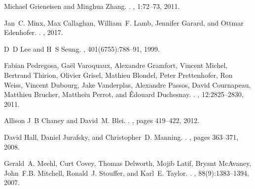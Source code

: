 \documentclass{article}
\begin{document}
\begin{thebibliography}{1}
	
	Michael Grieneisen and Minghua Zhang.
	.
	, 1:72--73, 2011.
	
	Jan~C. Minx, Max Callaghan, William~F. Lamb, Jennifer Garard, and Ottmar
	Edenhofer.
	.
	, 2017.
	
	D~D Lee and H~S Seung.
	, 401(6755):788--91, 1999.
	
	Fabian Pedregosa, Ga{\"{e}}l Varoquaux, Alexandre Gramfort, Vincent Michel,
	Bertrand Thirion, Olivier Grisel, Mathieu Blondel, Peter Prettenhofer, Ron
	Weiss, Vincent Dubourg, Jake Vanderplas, Alexandre Passos, David Cournapeau,
	Matthieu Brucher, Mattheiu Perrot, and {\'{E}}douard Duchesnay.
	.
	, 12:2825--2830, 2011.
	
	Allison J~B Chaney and David~M. Blei.
	.
	, pages 419--422, 2012.
	
	David Hall, Daniel Jurafsky, and Christopher~D. Manning.
	.
	, pages 363--371, 2008.
	
	Gerald~A. Meehl, Curt Covey, Thomas Delworth, Mojib Latif, Bryant McAvaney,
	John~F.B. Mitchell, Ronald~J. Stouffer, and Karl~E. Taylor.
	.
	,
	88(9):1383--1394, 2007.
	
\end{thebibliography}



\end{document}
